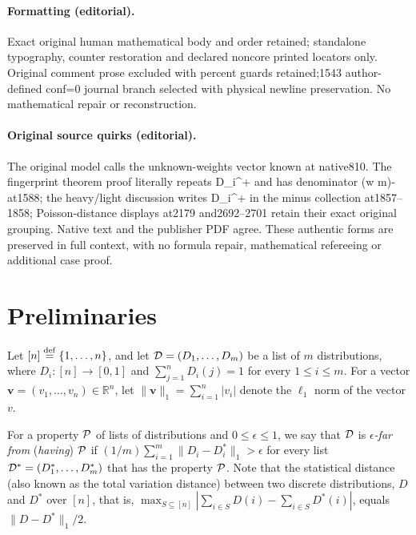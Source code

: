 \documentclass[10pt]{article}
\theoremstyle{definition}
\numberwithin{equation}{section}
\newcommand{\eps}{\epsilon}
\newcommand{\calD}{{\cal D}}
\newcommand{\eqdef}{\stackrel{\rm def}{=}}
\newcommand{\vbf}{{\mathbf v}}
\newcommand{\calP}{{\cal P}}
\begin{document}
\paragraph{Formatting (editorial).} Exact original human mathematical body and order retained; standalone typography, counter restoration and declared noncore printed locators only. Original comment prose excluded with percent guards retained;1543 author-defined conf=0 journal branch selected with physical newline preservation. No mathematical repair or reconstruction.
\paragraph{Original source quirks (editorial).} The original model calls the unknown-weights vector known at native810. The fingerprint theorem proof literally repeats D\_i\textasciicircum{}+ and has denominator (w m)- at1588; the heavy/light discussion writes D\_i\textasciicircum{}+ in the minus collection at1857–1858; Poisson-distance displays at2179 and2692–2701 retain their exact original grouping. Native text and the publisher PDF agree. These authentic forms are preserved in full context, with no formula repair, mathematical refereeing or additional case proof.
\clearpage
\setcounter{section}{1}
\section{Preliminaries}\label{prel.sec}

Let $[n]\eqdef \{1,\ldots,n\}$, and let
$\calD = (D_1,\ldots,D_m)$ be a list of $m$ distributions,
where $D_i : [n] \to [0,1]$ and $\sum_{j=1}^n D_i(j) =1$
for every $1 \leq i \leq m$.
For a vector $\vbf = (v_1,\ldots,v_n) \in \mathbb{R}^n$,
let $\|\vbf\|_1 = \sum_{i=1}^n |v_i|$ denote the
$\ell_1$ norm of the vector $v$.

%
For a property  $\calP$ of lists of distributions and
$0 \leq \eps \leq 1$, we say that
$\calD$ is {\em $\eps$-far from\/} (\emph{having}) $\calP$ if
$({1}/{m}) \sum_{i=1}^m \|D_i - D^*_i\|_1 > \eps$
for every list $\calD^* = (D^*_1,\ldots,D^*_m)$
that has the property $\calP$. Note that
the statistical distance (also known as the total variation distance)
between two discrete distributions, $D$ and $D^*$ over $[n]$,
that is,
$\max_{S\subseteq [n]} \left| \sum_{i\in S} D(i) -\sum_{i\in S} D^*(i)\right|$,
 equals $\|D - D^*\|_1/2$.
\end{document}

